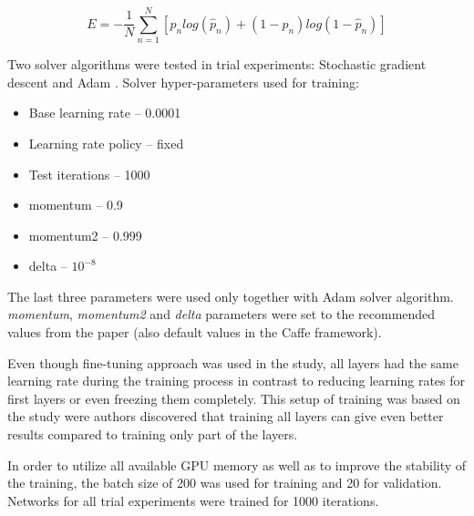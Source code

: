     $$
    E = -\frac{1}{N} \sum_{n=1}^{N} [p_n log (\hat p_n) + (1 - p_n) log(1 - \hat p_n)]
    $$
    
    Two solver algorithms were tested in trial experiments: Stochastic gradient descent \cite{sgd} and Adam \cite{adam}. Solver hyper-parameters used for training:
    \begin{itemize}
        \item Base learning rate -- 0.0001
        \item Learning rate policy -- fixed
        \item Test iterations -- 1000
        \item momentum -- 0.9
        \item momentum2 -- 0.999
        \item delta -- $10^{-8}$
    \end{itemize}
    
    The last three parameters were used only together with Adam solver algorithm. \textit{momentum}, \textit{momentum2} and \textit{delta} parameters were set to the recommended values from the paper \cite{adam} (also default values in the Caffe framework).
    
    Even though fine-tuning approach was used in the study, all layers had the same learning rate during the training process in contrast to reducing learning rates for first layers or even freezing them completely. This setup of training was based on the study \cite{Yosinski2014HowTransferable} were authors discovered that training all layers can give even better results compared to training only part of the layers.
    
    In order to utilize all available GPU memory as well as to improve the stability of the training, the batch size of 200 was used for training and 20 for validation. Networks for all trial experiments were trained for 1000 iterations.
    
    
    
    
